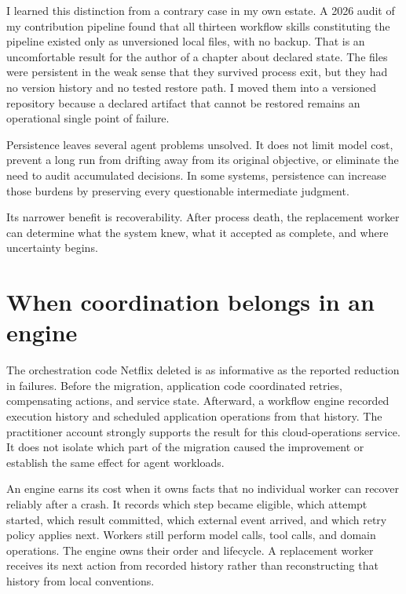 I learned this distinction from a contrary case in my own estate. A 2026 audit of my contribution pipeline found that all thirteen workflow skills constituting the pipeline existed only as unversioned local files, with no backup. That is an uncomfortable result for the author of a chapter about declared state. The files were persistent in the weak sense that they survived process exit, but they had no version history and no tested restore path. I moved them into a versioned repository because a declared artifact that cannot be restored remains an operational single point of failure.

Persistence leaves several agent problems unsolved. It does not limit model cost, prevent a long run from drifting away from its original objective, or eliminate the need to audit accumulated decisions. In some systems, persistence can increase those burdens by preserving every questionable intermediate judgment.

Its narrower benefit is recoverability. After process death, the replacement worker can determine what the system knew, what it accepted as complete, and where uncertainty begins.

\section{When coordination belongs in an engine}\label{when-coordination-belongs-in-an-engine}

The orchestration code Netflix deleted is as informative as the reported reduction in failures. Before the migration, application code coordinated retries, compensating actions, and service state. Afterward, a workflow engine recorded execution history and scheduled application operations from that history. The practitioner account strongly supports the result for this cloud-operations service. It does not isolate which part of the migration caused the improvement or establish the same effect for agent workloads.

An engine earns its cost when it owns facts that no individual worker can recover reliably after a crash. It records which step became eligible, which attempt started, which result committed, which external event arrived, and which retry policy applies next. Workers still perform model calls, tool calls, and domain operations. The engine owns their order and lifecycle. A replacement worker receives its next action from recorded history rather than reconstructing that history from local conventions.


